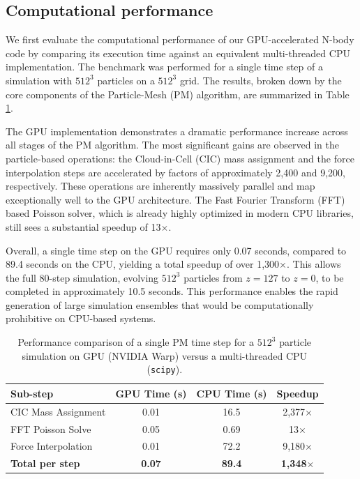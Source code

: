 \documentclass[]{article}
\begin{document}
\subsection{Computational performance}

We first evaluate the computational performance of our GPU-accelerated N-body code by comparing its execution time against an equivalent multi-threaded CPU implementation. The benchmark was performed for a single time step of a simulation with $512^3$ particles on a $512^3$ grid. The results, broken down by the core components of the Particle-Mesh (PM) algorithm, are summarized in Table \ref{tab:performance}.

The GPU implementation demonstrates a dramatic performance increase across all stages of the PM algorithm. The most significant gains are observed in the particle-based operations: the Cloud-in-Cell (CIC) mass assignment and the force interpolation steps are accelerated by factors of approximately 2,400 and 9,200, respectively. These operations are inherently massively parallel and map exceptionally well to the GPU architecture. The Fast Fourier Transform (FFT) based Poisson solver, which is already highly optimized in modern CPU libraries, still sees a substantial speedup of 13$\times$.

Overall, a single time step on the GPU requires only 0.07 seconds, compared to 89.4 seconds on the CPU, yielding a total speedup of over 1,300$\times$. This allows the full 80-step simulation, evolving $512^3$ particles from $z=127$ to $z=0$, to be completed in approximately 10.5 seconds. This performance enables the rapid generation of large simulation ensembles that would be computationally prohibitive on CPU-based systems.

\begin{table}[h!]
\centering
\caption{Performance comparison of a single PM time step for a $512^3$ particle simulation on GPU (NVIDIA Warp) versus a multi-threaded CPU (\texttt{scipy}).}
\label{tab:performance}
\begin{tabular}{lccc}
\hline
\hline
Sub-step & GPU Time (s) & CPU Time (s) & Speedup \\
\hline
CIC Mass Assignment & 0.01 & 16.5 & 2,377$\times$ \\
FFT Poisson Solve & 0.05 & 0.69 & 13$\times$ \\
Force Interpolation & 0.01 & 72.2 & 9,180$\times$ \\
\hline
\textbf{Total per step} & \textbf{0.07} & \textbf{89.4} & \textbf{1,348$\times$} \\
\hline
\end{tabular}
\end{table}
\end{document}
